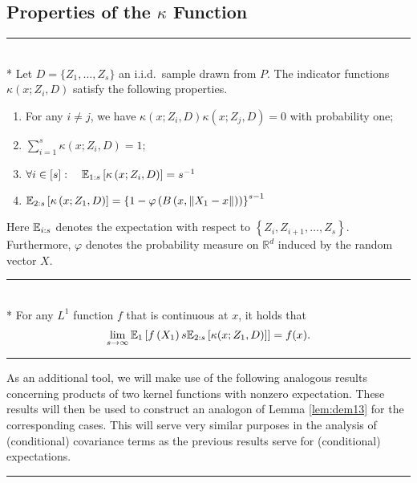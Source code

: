 \subsection{Properties of the $\kappa$ Function}
\hrule

\begin{lem}\label{lem:dem12}\mbox{}\\*
	Let $D = \{Z_1, \dotsc, Z_s\}$ an i.i.d.\ sample drawn from $P$.
	The indicator functions $\kappa\left(x; Z_{i}, D\right)$ satisfy the following properties.
	\begin{enumerate}
		\item For any $i \neq j$, we have $\kappa\left(x; Z_{i}, D\right) \kappa\left(x;
			      Z_{j}, D\right)=0$ with probability one;
		\item $\sum_{i=1}^{s} \kappa\left(x; Z_{i}, D\right)=1$;
		\item $\forall i \in [s]: \quad \mathbb{E}_{1:s}\left[\kappa\left(x; Z_{i}, D\right)\right]=s^{-1}$
		\item $\mathbb{E}_{2: s}\left[\kappa\left(x; Z_1, D\right)\right]
			      = \left\{1-\varphi\left(B\left(x,\left\|X_1-x\right\|\right)\right)\right\}^{s-1}$
	\end{enumerate}
	Here $\mathbb{E}_{i: s}$ denotes the expectation with respect to $\left\{Z_{i}, Z_{i+1}, \dotsc, Z_s\right\}$.
	Furthermore, $\varphi$ denotes the probability measure on $\mathbb{R}^{d}$ induced by the random vector $X$.
\end{lem}

\hrule

\begin{lem}\label{lem:dem13}\mbox{}\\*
	For any $L^1$ function $f$ that is continuous at $x$, it holds that
	\begin{equation}
		\lim _{s \rightarrow \infty} \mathbb{E}_{1}\left[f\left(X_1\right) s \mathbb{E}_{2:s}\left[\kappa(x; Z_1, D)\right]\right]
		= f(x).
	\end{equation}
\end{lem}

\hrule

As an additional tool, we will make use of the following analogous results concerning products of two kernel functions with nonzero expectation.
These results will then be used to construct an analogon of Lemma \ref{lem:dem13} for the corresponding cases.
This will serve very similar purposes in the analysis of (conditional) covariance terms as the previous results serve for (conditional) expectations.
\vspace{0.5cm}
\hrule

